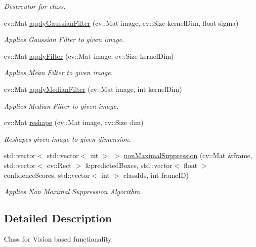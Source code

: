 \begin{DoxyCompactItemize}
\begin{DoxyCompactList}\small\item\em Destrcutor for class. \end{DoxyCompactList}\item 
cv\+::\+Mat \hyperlink{classVisionModule_a03604428a8b644291e24046b306250a3}{apply\+Gaussian\+Filter} (cv\+::\+Mat image, cv\+::\+Size kernel\+Dim, float sigma)
\begin{DoxyCompactList}\small\item\em Applies Gaussian Filter to given image. \end{DoxyCompactList}\item 
cv\+::\+Mat \hyperlink{classVisionModule_af8f8e435bac0d2db615b169de62567b9}{apply\+Filter} (cv\+::\+Mat image, cv\+::\+Size kernel\+Dim)
\begin{DoxyCompactList}\small\item\em Applies Mean Filter to given image. \end{DoxyCompactList}\item 
cv\+::\+Mat \hyperlink{classVisionModule_ac80542fc84b24a098d8334f924e36971}{apply\+Median\+Filter} (cv\+::\+Mat image, int kernel\+Dim)
\begin{DoxyCompactList}\small\item\em Applies Median Filter to given image. \end{DoxyCompactList}\item 
cv\+::\+Mat \hyperlink{classVisionModule_af6d95de1a23cb8d6ec6f646d1906fd63}{reshape} (cv\+::\+Mat image, cv\+::\+Size dim)
\begin{DoxyCompactList}\small\item\em Reshapes given image to given dimension. \end{DoxyCompactList}\item 
std\+::vector$<$ std\+::vector$<$ int $>$ $>$ \hyperlink{classVisionModule_a5fb286b3086a7235fda74ab7258bb227}{non\+Maximal\+Suppression} (cv\+::\+Mat \&frame, std\+::vector$<$ cv\+::\+Rect $>$ \&predicted\+Boxes, std\+::vector$<$ float $>$ confidence\+Scores, std\+::vector$<$ int $>$ class\+Ids, int frame\+ID)
\begin{DoxyCompactList}\small\item\em Applies Non Maximal Suppression Algorithm. \end{DoxyCompactList}\end{DoxyCompactItemize}


\subsection{Detailed Description}
Class for Vision based functionality. 

